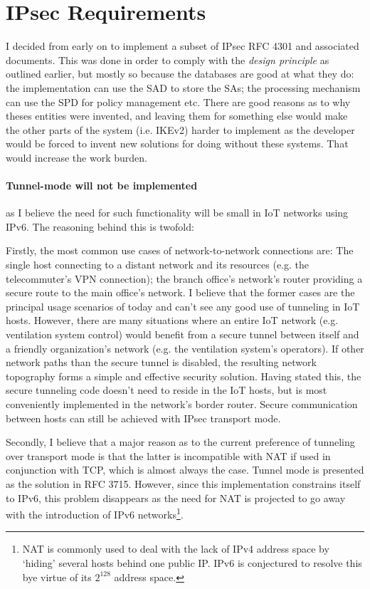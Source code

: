 \documentclass[final,a4paper,twoside,11pt,onecolumn]{report}
\begin{document}
\section{IPsec Requirements}

I decided from early on to implement a subset of IPsec RFC 4301 and associated documents. This was done in order to comply with the \emph{design principle} as outlined earlier, but mostly so because the databases are good at what they do: the implementation can use the SAD to store the SAs; the processing mechanism can use the SPD for policy management etc. There are good reasons as to why theses entities were invented, and leaving them for something else would make the other parts of the system (i.e. IKEv2) harder to implement as the developer would be forced to invent new solutions for doing without these systems. That would increase the work burden.

\paragraph{Tunnel-mode will not be implemented} as I believe the need for such functionality will be small in IoT networks using IPv6. The reasoning behind this is twofold:

Firstly, the most common use cases of network-to-network connections are: The single host connecting to a distant network and its resources (e.g. the telecommuter's VPN connection); the branch office's network's router providing a secure route to the main office's network. I believe that the former cases are the principal usage scenarios of today and can't see any good use of tunneling in IoT hosts. However, there are many situations where an entire IoT network (e.g. ventilation system control) would benefit from a secure tunnel between itself and a friendly organization's network (e.g. the ventilation system's operators). If other network paths than the secure tunnel is disabled, the resulting network topography forms a simple and effective security solution. Having stated this, the secure tunneling code doesn't need to reside in the IoT hosts, but is most conveniently implemented in the network's border router. Secure communication between hosts can still be achieved with IPsec transport mode.

Secondly, I believe that a major reason as to the current preference of tunneling over transport mode is that the latter is incompatible with NAT if used in conjunction with TCP, which is almost always the case. Tunnel mode is presented as the solution in RFC 3715\cite[2.1.b)]{rfc3715}. However, since this implementation constrains itself to IPv6, this problem disappears as the need for NAT is projected to go away with the introduction of IPv6 networks\footnote{NAT is commonly used to deal with the lack of IPv4 address space by `hiding' several hosts behind one public IP. IPv6 is conjectured to resolve this bye virtue of its $2^{128}$ address space.}.
\end{document}
